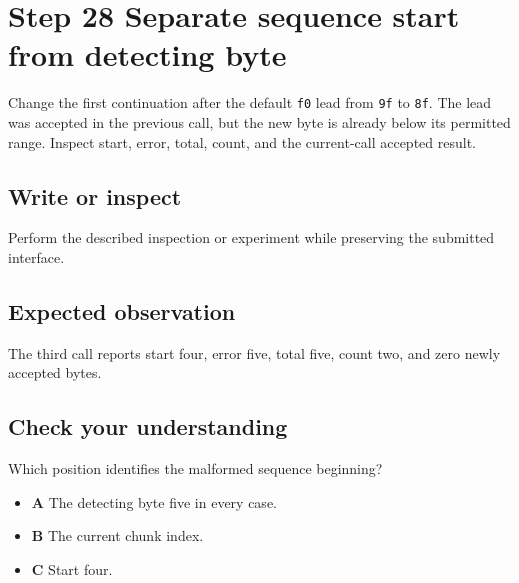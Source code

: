 \section{Step 28 Separate sequence start from detecting byte}\label{utf8-s28}

Change the first continuation after the default \texttt{f0} lead from \texttt{9f} to \texttt{8f}. The lead was accepted in the previous call, but the new byte is already below its permitted range. Inspect start, error, total, count, and the current-call accepted result.

\subsection{Write or inspect}
Perform the described inspection or experiment while preserving the submitted interface.

\subsection{Expected observation}
The third call reports start four, error five, total five, count two, and zero newly accepted bytes.

\subsection{Check your understanding}
Which position identifies the malformed sequence beginning?

\begin{itemize}
  \item \textbf{A} The detecting byte five in every case.
  \item \textbf{B} The current chunk index.
  \item \textbf{C} Start four.
\end{itemize}
